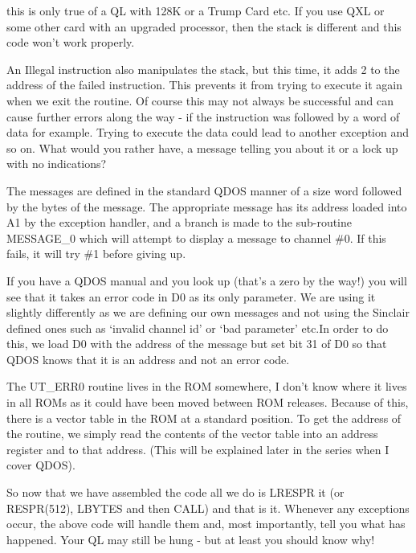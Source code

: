 \begin{warning}
this is only true of a QL with 128K or a Trump Card etc. If you
      use QXL or some other card with an upgraded processor, then the stack is
      different and this code won't work properly.
\end{warning}

An Illegal instruction also manipulates the stack, but this time, it
    adds 2 to the address of the failed instruction. This prevents it from
    trying to execute it again when we exit the routine. Of course this may
    not always be successful and can cause further errors along the way -{} if
    the instruction was followed by a word of data for example. Trying to
    execute the data could lead to another exception and so on. What would you
    rather have, a message telling you about it or a lock up with no
    indications?

The messages are defined in the standard QDOS manner of a size word
    followed by the bytes of the message. The appropriate message has its
    address loaded into A1 by the exception handler, and a branch is made to
    the sub-{}routine MESSAGE\_0 which will attempt to display a message to
    channel \#0. If this fails, it will try \#1 before giving up.

If you have a QDOS manual and you look up  (that's a zero by
    the way!) you will see that it takes an error code in D0 as its only
    parameter. We are using it slightly differently as we are defining our own
    messages and not using the Sinclair defined ones such as `invalid channel
    id' or `bad parameter' etc.In order to do this, we load D0 with the
    address of the message but set bit 31 of D0 so that QDOS knows that it is
    an address and not an error code.

The UT\_ERR0 routine lives in the ROM somewhere, I don't know where
    it lives in all ROMs as it could have been moved between ROM releases.
    Because of this, there is a vector table in the ROM at a standard
    position. To get the address of the routine, we simply read the contents
    of the vector table into an address register and  to that address.
    (This will be explained later in the series when I cover QDOS).

So now that we have assembled the code all we do is LRESPR it (or
    RESPR(512), LBYTES and then CALL) and that is it. Whenever any exceptions
    occur, the above code will handle them and, most importantly, tell you
    what has happened. Your QL may still be hung -{} but at least you should
    know why!

